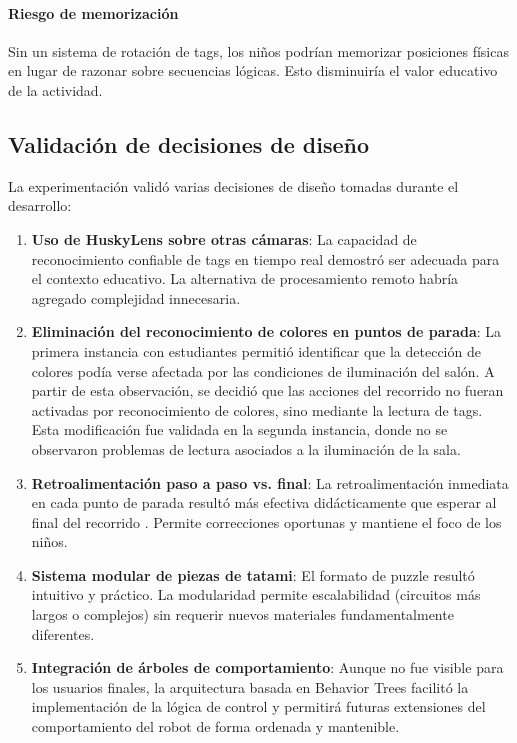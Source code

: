 \documentclass{prgrado}
\begin{document}
\paragraph{Riesgo de memorización} Sin un sistema de rotación de tags, los niños podrían memorizar posiciones físicas en lugar de razonar sobre secuencias lógicas. Esto disminuiría el valor educativo de la actividad.

\subsection{Validación de decisiones de diseño}
La experimentación validó varias decisiones de diseño tomadas durante el desarrollo:
\begin{enumerate}
\item \textbf{Uso de HuskyLens sobre otras cámaras}: La capacidad de reconocimiento confiable de tags en tiempo real demostró ser adecuada para el contexto educativo. La alternativa de procesamiento remoto habría agregado complejidad innecesaria.
\item \textbf{Eliminación del reconocimiento de colores en puntos de parada}: La primera instancia con estudiantes permitió identificar que la detección de colores podía verse afectada por las condiciones de iluminación del salón. A partir de esta observación, se decidió que las acciones del recorrido no fueran activadas por reconocimiento de colores, sino mediante la lectura de tags. Esta modificación fue validada en la segunda instancia, donde no se observaron problemas de lectura asociados a la iluminación de la sala.
\item \textbf{Retroalimentación paso a paso vs. final}: La retroalimentación inmediata en cada punto de parada resultó más efectiva didácticamente que esperar al final del recorrido \cite{marwan2022adaptiveFeedback}.  Permite correcciones oportunas y mantiene el foco de los niños.
\item \textbf{Sistema modular de piezas de tatami}: El formato de puzzle resultó intuitivo y práctico. La modularidad permite escalabilidad (circuitos más largos o complejos) sin requerir nuevos materiales fundamentalmente diferentes.
\item \textbf{Integración de árboles de comportamiento}: Aunque no fue visible para los usuarios finales, la arquitectura basada en Behavior Trees facilitó la implementación de la lógica de control y permitirá futuras extensiones del comportamiento del robot de forma ordenada y mantenible.
\end{enumerate}
\end{document}
